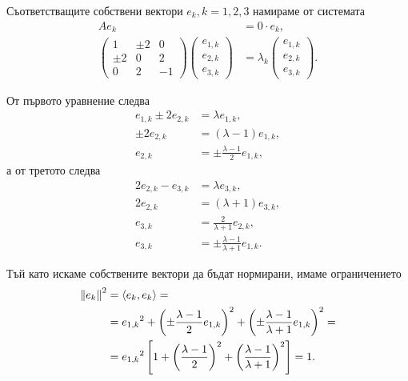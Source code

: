 \documentclass[numbers=endperiod, bibliography=totocnumbered]{scrartcl}
\begin{document}
\begin{solution}
  Съответстващите собствени вектори \( e_k, k = 1, 2, 3 \) намираме от системата
  \begingroup
  \allowdisplaybreaks
  \begin{align*}
    A e_k &= 0 \cdot e_k,
    \\
    \begin{pmatrix}
      1 & \pm 2 & 0 \\
      \pm 2 & 0 & 2 \\
      0 & 2 & -1
    \end{pmatrix}
    \begin{pmatrix}
      e_{1,k} \\ e_{2,k} \\ e_{3,k}
    \end{pmatrix}
    &=
    \lambda_k
    \begin{pmatrix}
      e_{1,k} \\ e_{2,k} \\ e_{3,k}
    \end{pmatrix}.
  \end{align*}
  \endgroup

  От първото уравнение следва
  \begin{align*}
    e_{1,k} \pm 2 e_{2,k} &= \lambda e_{1,k},
    \\
    \pm 2 e_{2,k} &= (\lambda - 1) e_{1,k},
    \\
    e_{2,k} &= \pm \frac {\lambda - 1} 2 e_{1,k},
  \end{align*}
  а от третото следва
  \begin{align*}
    2e_{2,k} - e_{3,k} &= \lambda e_{3,k},
    \\
    2 e_{2,k} &= (\lambda + 1) e_{3,k},
    \\
    e_{3,k} &= \frac 2 {\lambda + 1} e_{2,k},
    \\
    e_{3,k} &= \pm \frac {\lambda - 1} {\lambda + 1} e_{1,k}.
  \end{align*}

  Тъй като искаме собствените вектори да бъдат нормирани, имаме ограничението
  \begin{align*}
    {\left\Vert e_k \right\Vert}^2
    &=
    \left\langle e_k, e_k \right\rangle
    = \\ &=
    {e_{1,k}}^2 + {\left(\pm \frac {\lambda - 1} 2 e_{1,k} \right)}^2 + {\left(\pm \frac {\lambda - 1} {\lambda + 1} e_{1,k} \right)}^2
    = \\ &=
    {e_{1,k}}^2 \left[1 + {\left(\frac {\lambda - 1} 2 \right)}^2 + {\left(\frac {\lambda - 1} {\lambda + 1} \right)}^2 \right]
    =
    1.
  \end{align*}


\end{solution}
\end{document}
